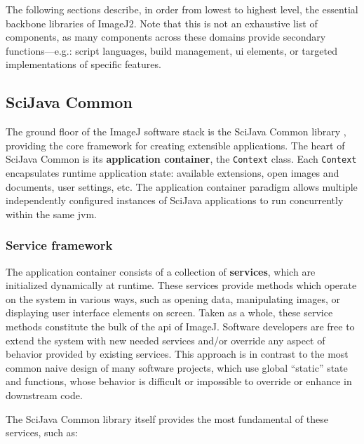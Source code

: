 \documentclass{bmcart}
\begin{document}
The following sections describe, in order from lowest to highest level, the
essential backbone libraries of ImageJ2. Note that this is not an exhaustive
list of components, as many components across these domains provide secondary
functions---e.g.: script languages, build management, \acrshort{ui} elements,
or targeted implementations of specific features.

\subsection*{SciJava Common}
The ground floor of the ImageJ software stack is the SciJava Common library
\cite{imagej_sjc}, providing the core framework for creating extensible
applications. The heart of SciJava Common is its \textbf{application
container}, the \texttt{Context} class. Each \texttt{Context} encapsulates
runtime application state: available extensions, open images and documents,
user settings, etc. The application container paradigm allows multiple
independently configured instances of SciJava applications to run concurrently
within the same \acrfull{jvm}.

\subsubsection*{Service framework}
The application container consists of a collection of \textbf{services}, which
are initialized dynamically at runtime. These services provide methods which
operate on the system in various ways, such as opening data, manipulating
images, or displaying user interface elements on screen. Taken as a whole,
these service methods constitute the bulk of the \acrfull{api} of ImageJ.
Software developers are free to extend the system with new needed services
and/or override any aspect of behavior provided by existing services. This
approach is in contrast to the most common naive design of many software
projects, which use global ``static'' state and functions, whose behavior is
difficult or impossible to override or enhance in downstream code.

The SciJava Common library itself provides the most fundamental of these
services, such as:
\end{document}
